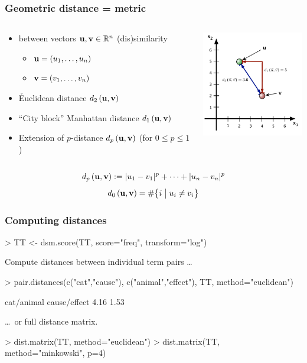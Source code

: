 \documentclass[t]{beamer} %
\begin{document}
\begin{frame}
  \frametitle{Geometric distance = metric}

  \begin{columns}[T]
    \begin{column}{60mm}
      \begin{itemize}
      \item {} between vectors $\vu, \vv \in \setR^n$ \so
        (dis)similarity
        \begin{itemize}
        \item $\vu = (u_1, \ldots, u_n)$
        \item $\vv = (v_1, \ldots, v_n)$
        \end{itemize}
      \item \h{Euclidean} distance $\dist[2]{\vu}{\vv}$
      \item ``City block'' \h{Manhattan} distance $\dist[1]{\vu}{\vv}$
      \item Extension of $p$-distance  $\dist[p]{\vu}{\vv}$ (for $0\leq p\leq 1$)
      \end{itemize}
    \end{column}
    \begin{column}{45mm}
      \includegraphics[width=45mm]{img/2_distance_examples}
    \end{column}
  \end{columns}
  \gap[.5]
  \[ \dist[p]{\vu}{\vv} \coloneq \abs{u_1 - v_1}^p + \dots + \abs{u_n - v_n}^p \]
  \[ \dist[0]{\vu}{\vv} = \# \bigsetdef{i}{u_i \neq v_i} \]
\end{frame}

\begin{frame}[fragile]
  \frametitle{Computing distances}

\begin{Rcode}
> TT <- dsm.score(TT, score="freq", transform="log")  
\end{Rcode}

\gap[.5]\pause
Compute distances between individual term pairs \ldots
\begin{Rcode}
> pair.distances(c("cat","cause"), c("animal","effect"), 
                 TT, method="euclidean")\begin{Rout}
  cat/animal cause/effect 
        4.16         1.53\end{Rout}
\end{Rcode}

\gap[.5]\pause
\ldots\ or full distance matrix. 
\begin{Rcode}
> dist.matrix(TT, method="euclidean")
> dist.matrix(TT, method="minkowski", p=4)
\end{Rcode}
\end{frame}
\end{document}
